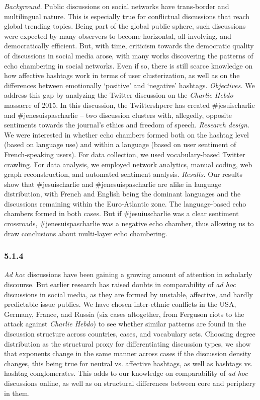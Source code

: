 \textit{Background.} Public discussions on social networks have trans-border and multilingual nature. This is especially true for conflictual discussions that reach global trending topics. Being part of the global public sphere, such discussions were expected by many observers to become horizontal, all-involving, and democratically efficient. But, with time, criticism towards the democratic quality of discussions in social media arose, with many works discovering the patterns of echo chambering in social networks. Even if so, there is still scarce knowledge on how affective hashtags work in terms of user clusterization, as well as on the differences between emotionally ‘positive’ and ‘negative’ hashtags. \textit{Objectives.} We address this gap by analyzing the Twitter discussion on the \textit{Charlie Hebdo} massacre of 2015. In this discussion, the Twittershpere has created \#jesuischarlie and \#jenesuispascharlie -- two discussion clusters with, allegedly, opposite sentiments towards the journal’s ethics and freedom of speech. \textit{Research design.} We were interested in whether echo chambers formed both on the hashtag level (based on language use) and within a language (based on user sentiment of French-speaking users). For data collection, we used vocabulary-based Twitter crawling. For data analysis, we employed network analytics, manual coding, web graph reconstruction, and automated sentiment analysis. \textit{Results.} Our results show that \#jesuischarlie and \#jenesuispascharlie are alike in language distribution, with French and English being the dominant languages and the discussions remaining within the Euro-Atlantic zone. The language-based echo chambers formed in both cases. But if \#jesuiuscharlie was a clear sentiment crossroads, \#jenesuispascharlie was a negative echo chamber, thus allowing us to draw conclusions about multi-layer echo chambering.

\subsubsection{5.1.4}

\textit{Ad hoc} discussions have been gaining a growing amount of attention in scholarly discourse. But earlier research has raised doubts in comparability of \textit{ad hoc} discussions in social media, as they are formed by unstable, affective, and hardly predictable issue publics. We have chosen inter-ethnic conflicts in the USA, Germany, France, and Russia (six cases altogether, from Ferguson riots to the attack against \textit{Charlie Hebdo}) to see whether similar patterns are found in the discussion structure across countries, cases, and vocabulary sets. Choosing degree distribution as the structural proxy for differentiating discussion types, we show that exponents change in the same manner across cases if the discussion density changes, this being true for neutral vs. affective hashtags, as well as hashtags vs. hashtag conglomerates. This adds to our knowledge on comparability of \textit{ad hoc} discussions online, as well as on structural differences between core and periphery in them.

